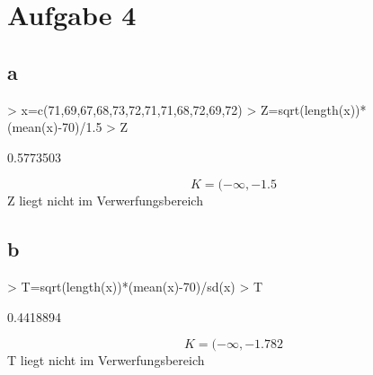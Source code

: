 

\section{Aufgabe 4}

\subsection{a}
\begin{Schunk}
\begin{Sinput}
> x=c(71,69,67,68,73,72,71,71,68,72,69,72)
> Z=sqrt(length(x))*(mean(x)-70)/1.5
> Z
\end{Sinput}
\begin{Soutput}
[1] 0.5773503
\end{Soutput}
\end{Schunk}
\[ K= (-\infty, -1.5 \]
Z liegt nicht im Verwerfungsbereich

\subsection{b}
\begin{Schunk}
\begin{Sinput}
> T=sqrt(length(x))*(mean(x)-70)/sd(x)
> T
\end{Sinput}
\begin{Soutput}
[1] 0.4418894
\end{Soutput}
\end{Schunk}
\[ K= (-\infty, -1.782 \]
T liegt nicht im Verwerfungsbereich

